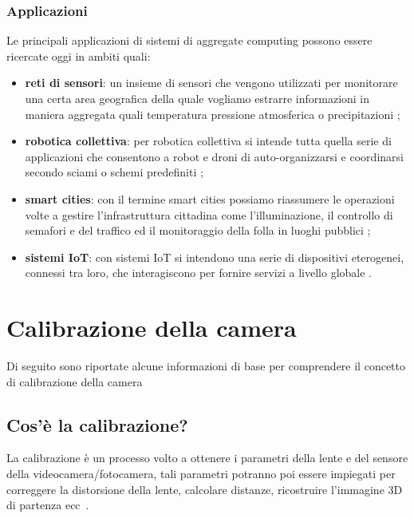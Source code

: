 \documentclass[12pt,a4paper,openright,twoside]{book}
\begin{document}
\subsubsection{Applicazioni}
Le principali applicazioni di sistemi di aggregate computing possono essere ricercate oggi in ambiti quali:
\begin{itemize}
	\item \textbf{reti di sensori}: un insieme di sensori che vengono utilizzati per monitorare una certa area geografica della quale vogliamo estrarre informazioni in maniera aggregata quali temperatura pressione atmosferica o precipitazioni \cite{9927406};
	\item \textbf{robotica collettiva}: per robotica collettiva si intende tutta quella serie di applicazioni che consentono a robot e droni di auto-organizzarsi e coordinarsi secondo sciami o schemi predefiniti \cite{10.1007/978-3-031-35361-1_2};
	\item \textbf{smart cities}: con il termine smart cities possiamo riassumere le operazioni volte a gestire l'infrastruttura cittadina come l'illuminazione, il controllo di semafori e del traffico ed il monitoraggio della folla in luoghi pubblici \cite{CASADEI2019154};
	\item \textbf{sistemi IoT}: con sistemi IoT si intendono una serie di dispositivi eterogenei, connessi tra loro, che interagiscono per fornire servizi a livello globale \cite{CASADEI2019252}.
\end{itemize}

\section{Calibrazione della camera} \label{sec:calibrazione_della_camera}
Di seguito sono riportate alcune informazioni di base per comprendere il concetto di calibrazione della camera
\subsection{Cos'è la calibrazione?}
La calibrazione è un processo volto a ottenere i parametri della lente e del sensore della videocamera/fotocamera,
tali parametri potranno poi essere impiegati per correggere la distorsione della lente, calcolare distanze, ricostruire l'immagine 3D di partenza ecc~\cite{cameraCalibrationMathWorks}.
\end{document}
